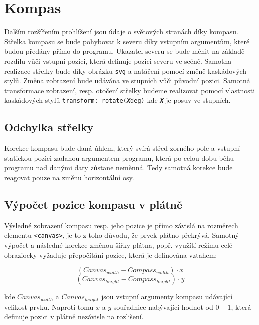 \section{Kompas}
Dalším rozšířením prohlížení jsou údaje o světových stranách díky kompasu. Střelka kompasu se bude pohybovat k severu díky vstupním argumentům, které budou předány přímo do programu. Ukazatel severu se bude měnit na základě rozdílu vůči vstupní pozici, která definuje pozici severu ve scéně. Samotna realizace střelky bude díky obrázku \texttt{svg} a natáčení pomocí změně kaskádových stylů. Změna zobrazení bude udávána ve stupních vůči původní pozici. Samotná transformace zobrazení, resp. otočení střelky budeme realizovat pomocí vlastnosti kaskádových stylů \texttt{transform: rotate(\textbf{\emph{X}}deg)} kde \texttt{\textbf{\emph{X}}} je posuv ve stupních.

\subsection{Odchylka střelky}
Korekce kompasu bude daná úhlem, který svírá střed zorného pole a vstupní statickou pozici zadanou argumentem programu, která po celou dobu běhu programu nad danými daty zůstane neměnná. Tedy samotná korekce bude reagovat pouze na změnu horizontální osy.

\subsection{Výpočet pozice kompasu v plátně}
Výsledné zobrazení kompasu resp. jeho pozice je přímo závislá na rozměrech elementu \texttt{<canvas>}, je to z toho důvodu, že prvek plátno překrývá. Samotný výpočet a následné korekce změnou šířky plátna, popř. využítí režimu celé obraziocky vyžaduje přepočítání pozice, která je definována vztahem:

$$ \left( Canvas_{width} - Compass_{width}\right) \cdot x  $$
$$ \left( Canvas_{height} - Compass_{height}\right) \cdot y  $$

kde $Canvas_{width}$ a $Canvas_{height}$ jsou vstupní argumenty kompasu udávající velikost prvku. Naproti tomu  $x$ a $y$ souřadnice nabývající hodnot od $0-1$, která definuje pozici v plátně nezávisle na rozlišení.


